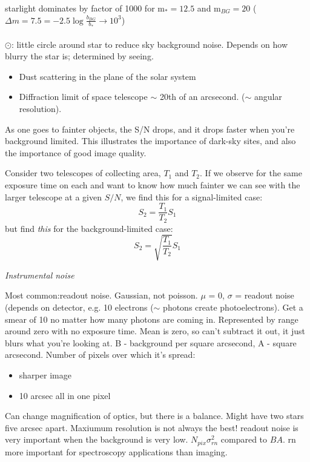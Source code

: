 \documentclass[12pt]{article}
\begin{document}
\textcolor{myBlue}{starlight dominates by factor of 1000 for
m$_* = 12.5$ and m$_{BG} = 20$ ($\Delta m = 7.5 
= -2.5\log\frac{b_{BG}}{b_*}
\rightarrow 10^3$)\\\\
\large$\odot$: \normalsize little circle around star to reduce sky
background noise. Depends on how blurry the star is; determined by
seeing.
\begin{itemize}
    \item Dust scattering in the plane of the solar system
    \item Diffraction limit of space telescope $\sim$ 20th of an
    arcsecond. ($\sim$ angular resolution).
\end{itemize}
}

As one goes to fainter objects, the S/N drops, and it drops faster
when you're background limited. This illustrates the importance of
dark-sky sites, and also the importance of good image quality.

Consider two telescopes of collecting area, $T_1$ and $T_2$.
If we observe for the same exposure time on each and want to know how
much fainter we can see with the larger telescope at a given $S/N$, we
find this for a signal-limited case:
$$ S_2 = \frac{T_1}{T_2}S_1 $$
but find \emph{this} for the background-limited case:
$$ S_2 = \sqrt{\frac{T_1}{T_2}}S_1  $$

\emph{Instrumental noise}

\textcolor{myBlue}{Most common:readout noise. Gaussian, not poisson.
$\mu$ = 0, $\sigma$ = readout noise (depends on detector, e.g. 10
electrons ($\sim$ photons create photoelectrons). Get a smear of 10 no
matter how many photons are coming in. Represented by range around
zero with no exposure time. Mean is zero, so can't subtract it out, it
just blurs what you're looking at. B - background per square
arcsecond, A - square arcsecond. Number of pixels over which it's
spread:
\begin{itemize}
    \item sharper image
    \item 10 arcsec all in one pixel
\end{itemize}
Can change magnification of optics, but there is a balance. Might have
two stars five arcsec apart. Maxiumum resolution is not always the
best! readout noise is very important when the background is very low.
$N_{pix}\sigma_{rn}^2$ compared to $BA$. rn more important for
spectroscopy applications than imaging.
}
\end{document}
